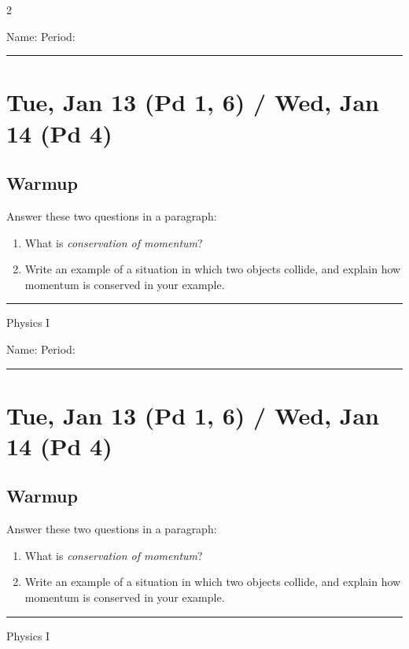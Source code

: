 \documentclass[10pt,landscape]{exam}
\def\todayDate{Tue, Jan 13 (Pd 1, 6) / Wed, Jan 14 (Pd 4)}
\def\content{
  Answer these two questions in a paragraph:
  
  \begin{enumerate}
    \item What is \emph{conservation of momentum}?
    \item Write an example of a situation in which two objects collide, and explain how momentum is conserved in your example.
  \end{enumerate}
  
}
\begin{document}
\pagestyle{empty}

\setlength{\columnsep}{0.8in}
\begin{multicols*}{2}

\noindent  
Name: \hfill Period: \hspace{5em}
\vspace{0.5em}
\hrule

\section*{\todayDate}
\subsection*{Warmup}

\content

\vfill
\hrule
\vspace{0.5em}
\hfill {\sc Physics I}

\columnbreak

\noindent  
Name: \hfill Period: \hspace{5em}
\vspace{0.5em}
\hrule

\section*{\todayDate}
\subsection*{Warmup}

\content

\vfill
\hrule
\vspace{0.5em}
\hfill {\sc Physics I}

\end{multicols*}
\end{document}
